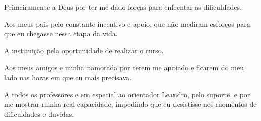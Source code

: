 \begin{agradecimentos}
Primeiramente a Deus por ter me dado forças para enfrentar as dificuldades.

Aos meus pais pelo constante incentivo e apoio, que não mediram esforços para que eu chegasse nessa etapa da vida.

A instituição pela oportunidade de realizar o curso.

Aos meus amigos e minha namorada por terem me apoiado e ficarem do meu lado nas horas em que eu mais precisava.

A todos os professores e em especial ao orientador Leandro, pelo suporte, e por me mostrar minha real capacidade, impedindo que eu desistisse nos momentos de dificuldades e duvidas.

\end{agradecimentos}
